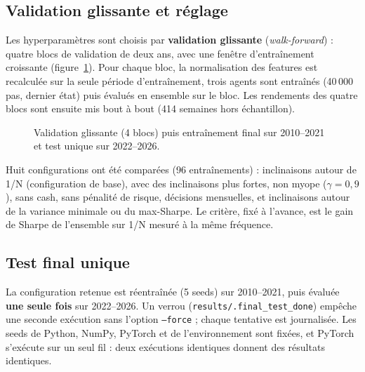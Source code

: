 \documentclass[11pt,a4paper]{article}
\begin{document}
\subsection{Validation glissante et réglage}
Les hyperparamètres sont choisis par \textbf{validation glissante} (\emph{walk-forward}) : quatre blocs de
validation de deux ans, avec une fenêtre d'entraînement croissante (figure~\ref{fig:walk}). Pour chaque bloc,
la normalisation des features est recalculée sur la seule période d'entraînement, trois agents sont entraînés
(40\,000 pas, dernier état) puis évalués en ensemble sur le bloc. Les rendements des quatre blocs sont ensuite
mis bout à bout (414 semaines hors échantillon).

\begin{figure}[H]
\centering
{}
\caption{Validation glissante (4 blocs) puis entraînement final sur 2010--2021 et test unique sur 2022--2026.}
\label{fig:walk}
\end{figure}

Huit configurations ont été comparées (96 entraînements) : inclinaisons autour de 1/N (configuration de
base), avec des inclinaisons plus fortes, non myope (\(\gamma=0{,}9\)), sans cash, sans pénalité de risque,
décisions mensuelles, et inclinaisons autour de la variance minimale ou du max-Sharpe. Le critère, fixé à
l'avance, est le gain de Sharpe de l'ensemble sur 1/N mesuré à la même fréquence.

\subsection{Test final unique}
La configuration retenue est réentraînée (5 seeds) sur 2010--2021, puis évaluée \textbf{une seule fois} sur
2022--2026. Un verrou (\texttt{results/.final\_test\_done}) empêche une seconde exécution sans l'option
\texttt{--force} ; chaque tentative est journalisée. Les seeds de Python, NumPy, PyTorch et de
l'environnement sont fixées, et PyTorch s'exécute sur un seul fil : deux exécutions identiques donnent des
résultats identiques.
\end{document}
